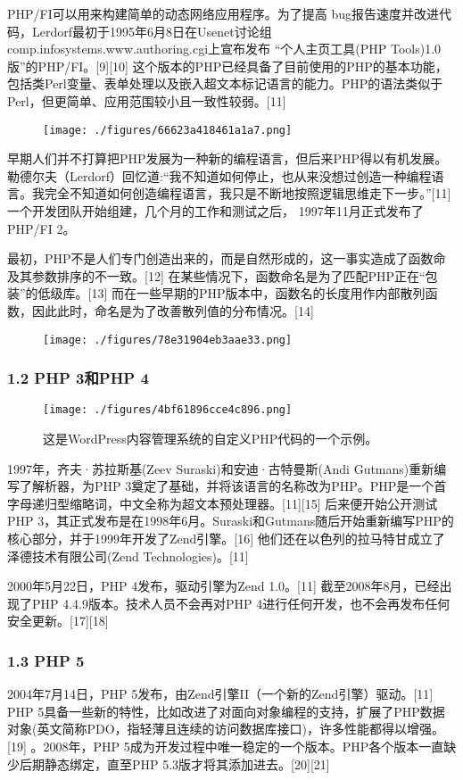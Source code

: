 PHP/FI可以用来构建简单的动态网络应用程序。为了提高 bug报告速度并改进代码，Lerdorf最初于1995年6月8日在Usenet讨论组comp.infosystems.www.authoring.cgi上宣布发布 “个人主页工具(PHP Tools)1.0版”的PHP/FI。[9][10] 这个版本的PHP已经具备了目前使用的PHP的基本功能，包括类Perl变量、表单处理以及嵌入超文本标记语言的能力。PHP的语法类似于Perl，但更简单、应用范围较小且一致性较弱。[11]
\begin{figure}[ht]
\centering
\texttt{[image: ./figures/66623a418461a1a7.png]}
\caption\label{fig_PHP_2}
\end{figure}
早期人们并不打算把PHP发展为一种新的编程语言，但后来PHP得以有机发展。勒德尔夫（Lerdorf）回忆道:“我不知道如何停止，也从来没想过创造一种编程语言。我完全不知道如何创造编程语言，我只是不断地按照逻辑思维走下一步。”[11] 一个开发团队开始组建，几个月的工作和测试之后， 1997年11月正式发布了PHP/FI 2。

最初，PHP不是人们专门创造出来的，而是自然形成的，这一事实造成了函数命及其参数排序的不一致。[12] 在某些情况下，函数命名是为了匹配PHP正在“包装”的低级库。[13] 而在一些早期的PHP版本中，函数名的长度用作内部散列函数，因此此时，命名是为了改善散列值的分布情况。[14]
\begin{figure}[ht]
\centering
\texttt{[image: ./figures/78e31904eb3aae33.png]}
\caption\label{fig_PHP_3}
\end{figure}
\subsubsection{1.2 PHP 3和PHP 4}
\begin{figure}[ht]
\centering
\texttt{[image: ./figures/4bf61896cce4c896.png]}
\caption{这是WordPress内容管理系统的自定义PHP代码的一个示例。} \label{fig_PHP_4}
\end{figure}
1997年，齐夫·苏拉斯基(Zeev Suraski)和安迪·古特曼斯(Andi Gutmans)重新编写了解析器，为PHP 3奠定了基础，并将该语言的名称改为PHP。PHP是一个首字母递归型缩略词，中文全称为超文本预处理器。[11][15] 后来便开始公开测试PHP 3，其正式发布是在1998年6月。Suraski和Gutmans随后开始重新编写PHP的核心部分，并于1999年开发了Zend引擎。[16] 他们还在以色列的拉马特甘成立了泽德技术有限公司(Zend Technologies)。[11]

2000年5月22日，PHP 4发布，驱动引擎为Zend 1.0。[11] 截至2008年8月，已经出现了PHP 4.4.9版本。技术人员不会再对PHP 4进行任何开发，也不会再发布任何安全更新。[17][18]
\subsubsection{1.3 PHP 5}
2004年7月14日，PHP 5发布，由Zend引擎II（一个新的Zend引擎）驱动。[11] PHP 5具备一些新的特性，比如改进了对面向对象编程的支持，扩展了PHP数据对象(英文简称PDO，指轻薄且连续的访问数据库接口)，许多性能都得以增强。[19] 。2008年，PHP 5成为开发过程中唯一稳定的一个版本。PHP各个版本一直缺少后期静态绑定，直至PHP 5.3版才将其添加进去。[20][21]

